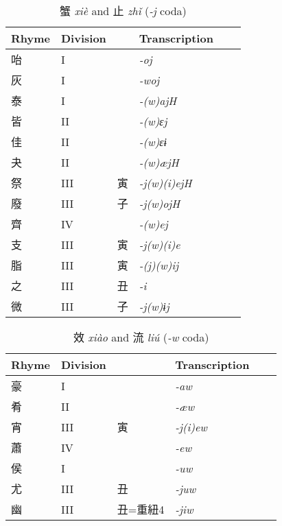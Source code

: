 \documentclass[oneside,a4paper,11pt]{article}
\newcommand{\ipa}[1]{{\phon\textit{#1}}}
\newcommand{\zh}[1]{{\cn #1}}
\newcommand{\zhc}[2]{\zh{#1} \ipa{#2}}
\begin{document}
\begin{table}[H]
\caption{\zhc{蟹}{xiè} and \zhc{止}{zhǐ} (\ipa{-j} coda)} \centering \label{tab:xie.zhi}
\begin{tabular}{llllll}
\toprule
Rhyme & Division & & Transcription \\
\midrule
\zh{咍} &	I &	&	\ipa{-oj} &	\\
\zh{灰} &	I &	&	\ipa{-woj} &	\\
\zh{泰} &	I &	&	\ipa{-(w)ajH} &	\\
\zh{皆} &	II &	&	\ipa{-(w)ɛj} &	\\
\zh{佳} &	II &	&	\ipa{-(w)ɛɨ} &	\\
\zh{夬} &	II &	&	\ipa{-(w)æjH} &	\\
\zh{祭} &	III &	\zh{寅} &	\ipa{-j(w)(i)ejH} &	\\
\zh{廢} &	III &	\zh{子} &	\ipa{-j(w)ojH} &	\\
\zh{齊} &	IV &	&	\ipa{-(w)ej} &	\\
\midrule
\zh{支} &	III &	\zh{寅} &	\ipa{-j(w)(i)e} &	\\
\zh{脂} &	III &	\zh{寅} &	\ipa{-(j)(w)ij} &	\\
\zh{之} &	III &	\zh{丑} &	\ipa{-i} &	\\
\zh{微} &	III &	\zh{子} &	\ipa{-j(w)ɨj} &	\\
\bottomrule
\end{tabular}
\end{table}


\begin{table}[H]
\caption{\zhc{效}{xiào} and \zhc{流}{liú} (\ipa{-w} coda)} \centering \label{tab:xiao}
\begin{tabular}{llllll}
\toprule
Rhyme & Division & & Transcription \\
\midrule
\zh{豪} &	I &	&	\ipa{-aw} &	\\
\zh{肴} &	II &	&	\ipa{-æw} &	\\
\zh{宵} &	III &	\zh{寅} &	\ipa{-j(i)ew} &	\\
\zh{蕭} &	IV &	&	\ipa{-ew} &	\\
\zh{侯} &	I &	&	\ipa{-uw} &	\\
\zh{尤} &	III &	\zh{丑} &	\ipa{-juw} &	\\
\zh{幽} &	III &	\zh{丑}=\zh{重紐}4 &	\ipa{-jiw} &	\\
\bottomrule
\end{tabular}
\end{table}
\end{document}
